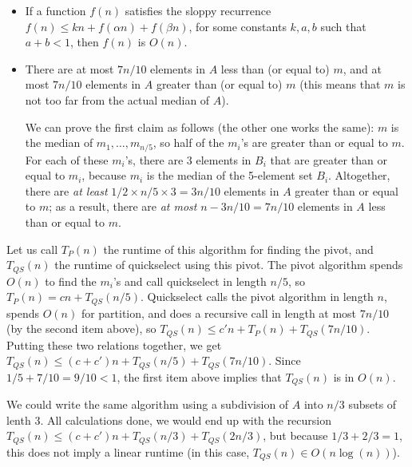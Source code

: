 \documentclass{report}
\begin{document}
\begin{itemize}
\item If a function $f(n)$ satisfies the sloppy recurrence $f(n) \le k n + f(\alpha n) + f(\beta n)$,
  for some constants $k,a,b$ such that $a+b < 1$, then $f(n)$ is $O(n)$. 
\item There are at most $7n/10$ elements in $A$ less than (or equal to) $m$, and 
  at most $7n/10$ elements in $A$ greater than (or equal to) $m$ (this means that $m$ is not 
  too far from the actual median of $A$).

  We can prove the first claim as follows (the other one works the
  same): $m$ is the median of $m_1,\dots,m_{n/5}$, so half of the
  $m_i$'s are greater than or equal to $m$. For each of these $m_i$'s,
  there are $3$ elements in $B_i$ that are greater than or equal to
  $m_i$, because $m_i$ is the median of the 5-element set
  $B_i$. Altogether, there are {\em at least} $1/2 \times n/5 \times 3
  = 3n/10$ elements in $A$ greater than or equal to $m$; as a result,
  there are {\em at most} $n-3n/10=7n/10$ elements in $A$ less than or
  equal to $m$.
\end{itemize}

Let us call $T_{P}(n)$ the runtime of this algorithm for finding the
pivot, and $T_{QS}(n)$ the runtime of quickselect using this
pivot. The pivot algorithm spends $O(n)$ to find the $m_i$'s and call
quickselect in length $n/5$, so $T_P(n) = cn + T_{QS}(n/5)$.
Quickselect calls the pivot algorithm in length $n$, spends $O(n)$ for
partition, and does a recursive call in length at most $7n/10$ (by the
second item above), so $T_{QS}(n) \le c'n + T_P(n) +
T_{QS}(7n/10)$. Putting these two relations together, we get
$T_{QS}(n) \le (c+c') n + T_{QS}(n/5)+ T_{QS}(7n/10)$. Since 
$1/5 + 7/10 = 9/10 < 1$, the first item above implies that $T_{QS}(n)$ 
is in $O(n)$.

We could write the same algorithm using a subdivision of $A$ into 
$n/3$ subsets of lenth 3. All calculations done, we would end up 
with the recursion $T_{QS}(n) \le (c+c') n + T_{QS}(n/3)+ T_{QS}(2n/3)$,
but because $1/3 + 2/3 =1$, this does not imply a linear runtime
(in this case, $T_{QS}(n) \in O(n\log(n))$).
\end{document}
